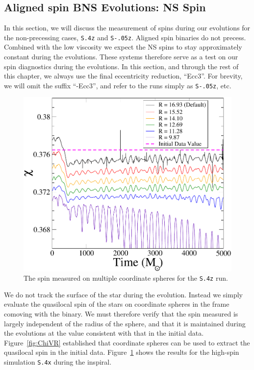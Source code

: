 \subsection{Aligned spin BNS Evolutions: NS Spin}
\label{sec:EvolutionSpin}

In this section, we will discuss the measurement of spins during our
evolutions for the non-precessing cases, {\tt S.4z} and {\tt S-.05z}. Aligned
spin binaries do not precess. Combined with the low viscosity we
expect the NS spins to stay approximately constant during the
evolutions. These systems therefore serve as a test on our spin
diagnostics during the evolutions.
In this section, and through the rest of this chapter, we always use the
final eccentricity reduction, ``Ecc3''. For brevity, we will omit the
suffix ``-Ecc3'', and refer to the runs simply as {\tt S-.05z}, etc.

\begin{figure}
\includegraphics[width=0.95\columnwidth]{chap2/ChiVTZoomed}
\caption[The spin measured on multiple
  coordinate spheres for the {\tt S.4z} run.]{{\label{fig:ChiVTZoomed}} The spin measured on multiple
  coordinate spheres for the {\tt S.4z} run.}
\end{figure}

We do not track the surface of the star during the evolution.
Instead we simply evaluate the quasilocal spin of the stars on
coordinate spheres in the frame comoving with the binary. We must
therefore verify that the spin measured is largely independent of the
radius of the sphere, and that it is maintained during the evolutions
at the value consistent with that in the initial data.
Figure~\ref{fig:ChiVR} established that coordinate spheres can be used
to extract the quasilocal spin in the initial data.
Figure~\ref{fig:ChiVTZoomed} shows the results for the high-spin
simulation {\tt S.4x} during the inspiral.

